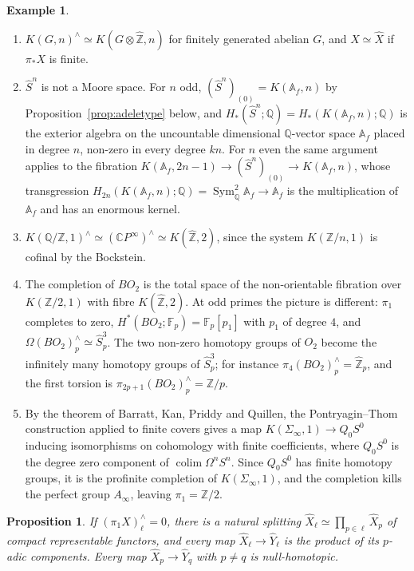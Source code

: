 \documentclass[11pt]{amsart}
\theoremstyle{plain}
\newtheorem{proposition}[theorem]{Proposition}
\theoremstyle{definition}
\newtheorem{example}[theorem]{Example}
\numberwithin{equation}{section}
\newcommand{\Z}{\mathbb{Z}}
\newcommand{\Q}{\mathbb{Q}}
\newcommand{\F}{\mathbb{F}}
\newcommand{\Zhat}{\widehat{\mathbb{Z}}}
\newcommand{\Af}{\mathbb{A}_f}
\newcommand{\CP}{\mathbb{C}P}
\newcommand{\hX}{\widehat{X}}
\DeclareMathOperator{\colim}{colim}
\begin{document}
\begin{example}\label{ex:completions}
\begin{enumerate}[label=(\arabic*),leftmargin=*]
\item $K(G,n)^\wedge\simeq K(G\otimes\Zhat,n)$ for finitely generated abelian $G$, and $X\simeq\hX$ if $\pi_*X$ is finite.
\item $\widehat S^n$ is not a Moore space.
For $n$ odd, $(\widehat S^n)_{(0)}=K(\Af,n)$ by Proposition~\ref{prop:adeletype} below, and $H_*(\widehat S^n;\Q)=H_*(K(\Af,n);\Q)$ is the exterior algebra on the uncountable dimensional $\Q$-vector space $\Af$ placed in degree $n$, non-zero in every degree $kn$.
For $n$ even the same argument applies to the fibration $K(\Af,2n-1)\to(\widehat S^n)_{(0)}\to K(\Af,n)$, whose transgression $H_{2n}(K(\Af,n);\Q)=\operatorname{Sym}^2_\Q\Af\to\Af$ is the multiplication of $\Af$ and has an enormous kernel.
\item $K(\Q/\Z,1)^\wedge\simeq(\CP^\infty)^\wedge\simeq K(\Zhat,2)$, since the system $K(\Z/n,1)$ is cofinal by the Bockstein.
\item The completion of $BO_2$ is the total space of the non-orientable fibration over $K(\Z/2,1)$ with fibre $K(\Zhat,2)$.
At odd primes the picture is different: $\pi_1$ completes to zero, $H^*(BO_2;\F_p)=\F_p[p_1]$ with $p_1$ of degree $4$, and $\Omega(BO_2)^\wedge_p\simeq\widehat S^3_p$.
The two non-zero homotopy groups of $O_2$ become the infinitely many homotopy groups of $\widehat S^3_p$; for instance $\pi_4(BO_2)^\wedge_p=\Zhat_p$, and the first torsion is $\pi_{2p+1}(BO_2)^\wedge_p=\Z/p$.
\item By the theorem of Barratt, Kan, Priddy and Quillen, the Pontryagin--Thom construction applied to finite covers gives a map $K(\Sigma_\infty,1)\to Q_0S^0$ inducing isomorphisms on cohomology with finite coefficients, where $Q_0S^0$ is the degree zero component of $\colim\Omega^nS^n$.
Since $Q_0S^0$ has finite homotopy groups, it is the profinite completion of $K(\Sigma_\infty,1)$, and the completion kills the perfect group $A_\infty$, leaving $\pi_1=\Z/2$.
\end{enumerate}
\end{example}

\begin{proposition}\label{prop:padicsplit}
If $(\pi_1X)^\wedge_\ell=0$, there is a natural splitting $\hX_\ell\simeq\prod_{p\in\ell}\hX_p$ of compact representable functors, and every map $\hX_\ell\to\widehat Y_\ell$ is the product of its $p$-adic components.
Every map $\hX_p\to\widehat Y_q$ with $p\ne q$ is null-homotopic.
\end{proposition}
\end{document}
